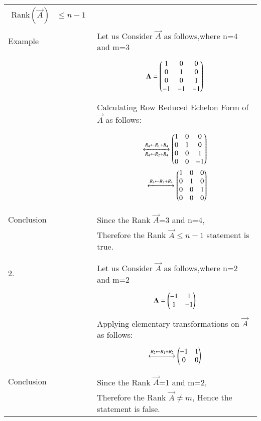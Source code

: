 \begin{longtable}{|l|l|}
{\begin{align*}
    \mbox{Rank}(\vec{A}) &\leq n-1
\end{align*}}\\
Example&Let us Consider $\vec{A}$ as follows,where n=4 and m=3\\
&\parbox{6cm}{\begin{align*}
    \mathbf{A}=\begin{pmatrix}1&0&0\\0&1&0\\0&0&1\\-1&-1&-1\end{pmatrix}
\end{align*}}\\
&Calculating Row Reduced Echelon Form of $\vec{A}$ as follows:\\
&\parbox{6cm}{\begin{align*}
    \xleftrightarrow[R_4 \leftarrow R_2+R_4]{R_4 \leftarrow R_1+R_4}
		\begin{pmatrix}1&0&0\\0&1&0\\0&0&1\\0&0&-1\end{pmatrix}\\
	\xleftrightarrow[]{R_4 \leftarrow R_3+R_4}
		\begin{pmatrix}1&0&0\\0&1&0\\0&0&1\\0&0&0\end{pmatrix}
\end{align*}}\\
\hline
&\\
Conclusion&Since the Rank  $\vec{A}$=3 and n=4,\\
&Therefore the Rank $\vec{A} \leq n-1$ statement is true.\\
&\\
\hline
&\\
2.&Let us Consider $\vec{A}$ as follows,where n=2 and m=2\\
&\parbox{6cm}{\begin{align*}
    \mathbf{A}=\begin{pmatrix}-1&1\\1&-1\end{pmatrix}
\end{align*}}\\
&Applying elementary transformations on $\vec{A}$ as follows:\\
&\parbox{6cm}{\begin{align*}
    \xleftrightarrow[]{R_2 \leftarrow R_1+R_2}
		\begin{pmatrix}-1&1\\0&0\end{pmatrix}
\end{align*}}\\
\hline
&\\
Conclusion&Since the Rank  $\vec{A}$=1 and m=2,\\
&Therefore the Rank $\vec{A} \neq m$, Hence the statement is false.\\

\end{longtable}
